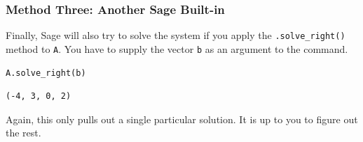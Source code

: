 \documentclass[10pt,]{book}
\theoremstyle{plain}
\numberwithin{equation}{section}
\begin{document}
\subsubsection[Method Three: Another Sage Built-in]{Method Three: Another Sage Built-in}\label{subsubsection-38}

        Finally, Sage will also try to solve the system if you apply the
        \verb?.solve_right()? method to \verb?A?. You have to supply the vector
        \verb?b? as an argument to the command.
\begin{lstlisting}[style=sageinput]
A.solve_right(b)
\end{lstlisting}
\begin{lstlisting}[style=sageoutput]
(-4, 3, 0, 2)
\end{lstlisting}
\par

        Again, this only pulls out a single particular solution. It is up to you
        to figure out the rest.
\typeout{************************************************}
\typeout{************************************************}
\end{document}
